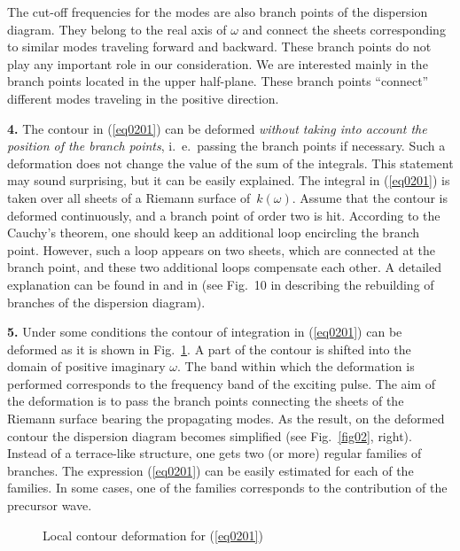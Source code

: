 \documentclass[12pt]{article}
\begin{document}
The cut-off frequencies for the modes are also branch points of the dispersion diagram. 
They belong to the real axis of $\omega$ and connect the sheets corresponding to similar modes 
traveling forward and backward. These branch points do not play any important role 
in our consideration. We are interested mainly in the branch points located in the
upper half-plane. These branch points  ``connect'' different modes traveling in the positive direction.   

{\bf 4.}
The contour in (\ref{eq0201}) can be deformed {\em without taking into account the position of the 
branch points\/}, i.~e.\ passing the branch points if necessary. 
Such a deformation does not change the value of the sum of the integrals. 
This statement may sound surprising, but it can be easily explained. The integral 
in (\ref{eq0201}) is taken over all sheets of a Riemann surface of~$k(\omega)$. Assume that 
the contour is deformed continuously, and 
a branch point of order two is hit. According to the Cauchy's theorem, one should keep an additional 
loop encircling the branch point. However, such a loop appears on two sheets, which are connected at the branch point, and these two additional loops compensate each other. A detailed explanation 
can be found in \cite{Miklowitz} and in \cite{Shanin} (see Fig.~10 in \cite{Shanin} describing the rebuilding of branches of the dispersion diagram).

{\bf 5.}
Under some conditions the contour of integration in (\ref{eq0201}) can be deformed as 
it is shown in Fig.~\ref{fig03}.
A part of the contour is shifted into the domain of positive imaginary $\omega$.
 The band within which the deformation is performed corresponds 
to the frequency band of the exciting pulse. The aim of the deformation is to pass 
the branch points connecting the sheets of the Riemann surface bearing the propagating modes. 
As the result, on the deformed contour the dispersion diagram becomes simplified 
(see Fig.~\ref{fig02}, right). 
Instead of a terrace-like structure, one gets two (or more) regular families of branches. The 
expression (\ref{eq0201}) can be easily estimated for each of the families. In some cases, 
one of the families corresponds to the contribution of the precursor wave.

\begin{figure}[ht]
\centerline{}
\caption{Local contour deformation for (\ref{eq0201})}
\label{fig03}
\end{figure}
\end{document}
